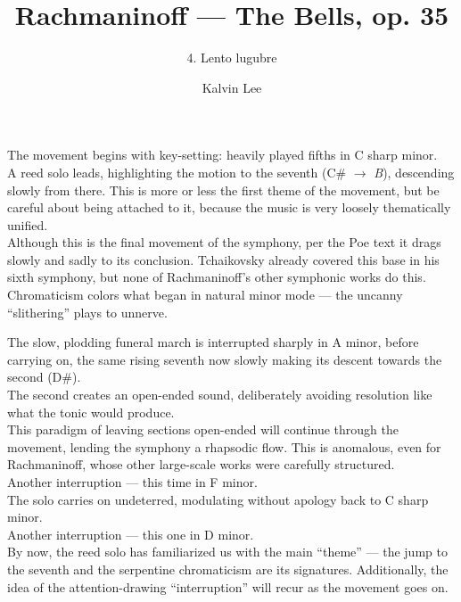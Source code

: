 \documentclass{beamer}
\title{Rachmaninoff --- The Bells, op. 35}
\subtitle{4. Lento lugubre}
\author{Kalvin Lee}
\date{}
\begin{document}
 

\begin{frame} 
  \titlepage
\end{frame} 

\begin{frame}
  The movement begins with key-setting: heavily played fifths in C sharp minor. 
  \pause \\ 
  A reed solo leads, highlighting the motion to the seventh (C\# \(\to\) \emph{B}), descending slowly from there. This is more or less the first theme of the movement, but be careful about being attached to it, because the music is very loosely thematically unified. 
  \pause \\ 
  Although this is the final movement of the symphony, per the Poe text it drags slowly and sadly to its conclusion. Tchaikovsky already covered this base in his sixth symphony, but none of Rachmaninoff's other symphonic works do this. 
  \pause \\
  Chromaticism colors what began in natural minor mode --- the uncanny ``slithering'' plays to unnerve. 
\end{frame} 

\begin{frame} 
  The slow, plodding funeral march is interrupted sharply in A minor, \pause before carrying on, \pause the same rising seventh now slowly making its descent towards the second (D\#). 
  \pause \\
  The second creates an open-ended sound, deliberately avoiding resolution like what the tonic would produce. 
  \pause \\ 
  This paradigm of leaving sections open-ended will continue through the movement, lending the symphony a rhapsodic flow. This is anomalous, even for Rachmaninoff, whose other large-scale works were carefully structured. 
  \pause \\ 
  Another interruption --- this time in F minor. 
  \pause \\ 
  The solo carries on undeterred, modulating without apology back to C sharp minor. 
  \pause \\ 
  Another interruption --- this one in D minor. 
  \pause \\ 
  By now, the reed solo has familiarized us with the main ``theme''  --- the jump to the seventh and the serpentine chromaticism are its signatures. Additionally, the idea of the attention-drawing ``interruption'' will recur as the movement goes on. 
\end{frame} 
\end{document}
